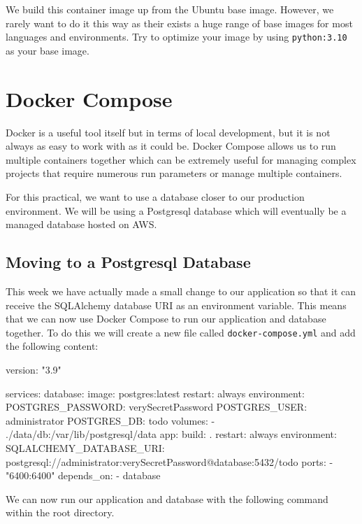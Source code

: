 \documentclass{csse4400}
\begin{document}
We build this container image up from the Ubuntu base image.
However, we rarely want to do it this way as their exists a huge range of base images for most languages and environments.
Try to optimize your image by using \texttt{python:3.10} as your base image.

\section{Docker Compose}

Docker is a useful tool itself but in terms of local development,
but it is not always as easy to work with as it could be.
Docker Compose allows us to run multiple containers together which can be extremely useful for managing complex projects that require numerous run parameters or manage multiple containers.

For this practical, we want to use a database closer to our production environment.
We will be using a Postgresql database which will eventually be a managed database hosted on AWS.

\subsection{Moving to a Postgresql Database}

This week we have actually made a small change to our application so that it can receive the SQLAlchemy database URI as an environment variable.
This means that we can now use Docker Compose to run our application and database together.
To do this we will create a new file called \texttt{docker-compose.yml} and add the following content:

\begin{code}[numbers=none]{}
  version: "3.9"

  services:
    database:
      image: postgres:latest
      restart: always
      environment:
        POSTGRES_PASSWORD: verySecretPassword
        POSTGRES_USER: administrator
        POSTGRES_DB: todo
      volumes:
        - ./data/db:/var/lib/postgresql/data
    app:
      build: .
      restart: always
      environment:
        SQLALCHEMY_DATABASE_URI: postgresql://administrator:verySecretPassword@database:5432/todo
      ports:
        - "6400:6400"
      depends_on:
        - database
\end{code}

We can now run our application and database with the following command within the root directory.

\end{document}
